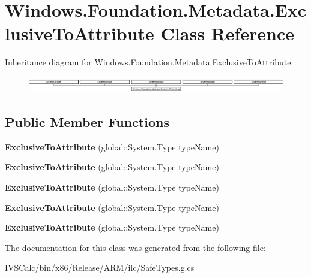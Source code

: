 \hypertarget{class_windows_1_1_foundation_1_1_metadata_1_1_exclusive_to_attribute}{}\section{Windows.\+Foundation.\+Metadata.\+Exclusive\+To\+Attribute Class Reference}
\label{class_windows_1_1_foundation_1_1_metadata_1_1_exclusive_to_attribute}
Inheritance diagram for Windows.\+Foundation.\+Metadata.\+Exclusive\+To\+Attribute\+:\begin{figure}[H]
\begin{center}
\leavevmode
\includegraphics[height=0.717949cm]{class_windows_1_1_foundation_1_1_metadata_1_1_exclusive_to_attribute}
\end{center}
\end{figure}
\subsection*{Public Member Functions}
\begin{DoxyCompactItemize}
\item 
\mbox{\label{class_windows_1_1_foundation_1_1_metadata_1_1_exclusive_to_attribute_adced042c7dd3cdbb808a9ec19b311de4}} 
{\bfseries Exclusive\+To\+Attribute} (global\+::\+System.\+Type type\+Name)
\item 
\mbox{\label{class_windows_1_1_foundation_1_1_metadata_1_1_exclusive_to_attribute_adced042c7dd3cdbb808a9ec19b311de4}} 
{\bfseries Exclusive\+To\+Attribute} (global\+::\+System.\+Type type\+Name)
\item 
\mbox{\label{class_windows_1_1_foundation_1_1_metadata_1_1_exclusive_to_attribute_adced042c7dd3cdbb808a9ec19b311de4}} 
{\bfseries Exclusive\+To\+Attribute} (global\+::\+System.\+Type type\+Name)
\item 
\mbox{\label{class_windows_1_1_foundation_1_1_metadata_1_1_exclusive_to_attribute_adced042c7dd3cdbb808a9ec19b311de4}} 
{\bfseries Exclusive\+To\+Attribute} (global\+::\+System.\+Type type\+Name)
\item 
\mbox{\label{class_windows_1_1_foundation_1_1_metadata_1_1_exclusive_to_attribute_adced042c7dd3cdbb808a9ec19b311de4}} 
{\bfseries Exclusive\+To\+Attribute} (global\+::\+System.\+Type type\+Name)
\end{DoxyCompactItemize}


The documentation for this class was generated from the following file\+:\begin{DoxyCompactItemize}
\item 
I\+V\+S\+Calc/bin/x86/\+Release/\+A\+R\+M/ilc/Safe\+Types.\+g.\+cs\end{DoxyCompactItemize}
